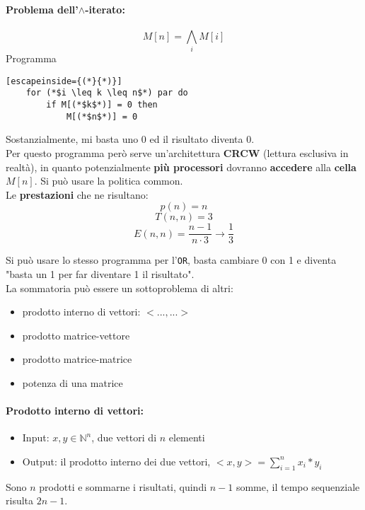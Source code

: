 \newpage

\paragraph{Problema dell'$\wedge$-iterato:}
$$ M[n] = \bigwedge_i M[i] $$
Programma
\begin{lstlisting}[escapeinside={(*}{*)}]
	for (*$i \leq k \leq n$*) par do 
		if M[(*$k$*)] = 0 then
			M[(*$n$*)] = 0
\end{lstlisting}

Sostanzialmente, mi basta uno 0 ed il risultato diventa 0.\\

Per questo programma però serve un'architettura \textbf{CRCW} (lettura esclusiva in realtà), in quanto potenzialmente \textbf{più processori} dovranno \textbf{accedere} alla \textbf{cella} $M[n]$. Si può usare la politica common.\\

Le \textbf{prestazioni} che ne risultano: 
$$ p(n) = n $$
$$ T(n,n) = 3 $$
$$ E(n,n) = \frac{n-1}{n \cdot 3} \rightarrow \frac{1}{3} $$

Si può usare lo stesso programma per l'\texttt{OR}, basta cambiare 0 con 1 e diventa "basta un 1 per far diventare 1 il risultato".\\

La sommatoria può essere un sottoproblema di altri: 
\begin{itemize}
	\item prodotto interno di vettori: $<... , ...>$ 
	\item prodotto matrice-vettore
	\item prodotto matrice-matrice
	\item potenza di una matrice
\end{itemize}

\newpage

\paragraph{Prodotto interno di vettori:}
\begin{itemize}
	\item Input: $x,y \in \mathbb{N}^n$, due vettori di $n$ elementi
	\item Output: il prodotto interno dei due vettori, $<x,y> = \sum_{i=1}^n x_i \ast y_i$
\end{itemize}
Sono $n$ prodotti e sommarne i risultati, quindi $n-1$ somme, il tempo sequenziale risulta $2n-1$.\\

